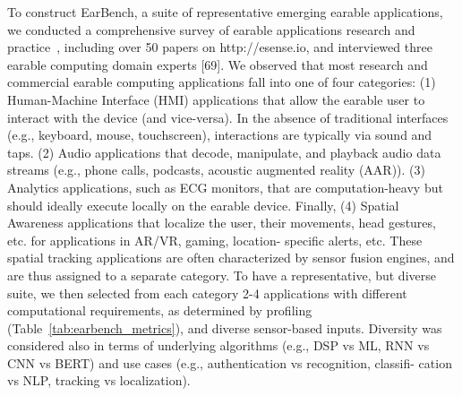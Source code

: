 To construct EarBench, a suite of representative emerging earable applications,
we conducted a comprehensive survey of earable applications research and
practice~\cite{}, including over 50 papers on http://esense.io, and interviewed
three earable computing domain experts [69]. We observed that most research and
commercial earable computing applications fall into one of four categories: (1)
Human-Machine Interface (HMI) applications that allow the earable user to
interact with the device (and vice-versa). In the absence of traditional
interfaces (e.g., keyboard, mouse, touchscreen), interactions are typically via
sound and taps. (2) Audio applications that decode, manipulate, and playback
audio data streams (e.g., phone calls, podcasts, acoustic augmented reality
(AAR)). (3) Analytics applications, such as ECG monitors, that are
computation-heavy but should ideally execute locally on the earable device.
Finally, (4) Spatial Awareness applications that localize the user, their
movements, head gestures, etc. for applications in AR/VR, gaming, location-
specific alerts, etc. These spatial tracking applications are often
characterized by sensor fusion engines, and are thus assigned to a separate
category. To have a representative, but diverse suite, we then selected from
each category 2-4 applications with different computational requirements, as
determined by profiling (Table~\ref{tab:earbench_metrics}), and diverse
sensor-based inputs. Diversity was considered also in terms of underlying
algorithms (e.g., DSP vs ML, RNN vs CNN vs BERT) and use cases (e.g.,
authentication vs recognition, classifi- cation vs NLP, tracking vs
localization).

